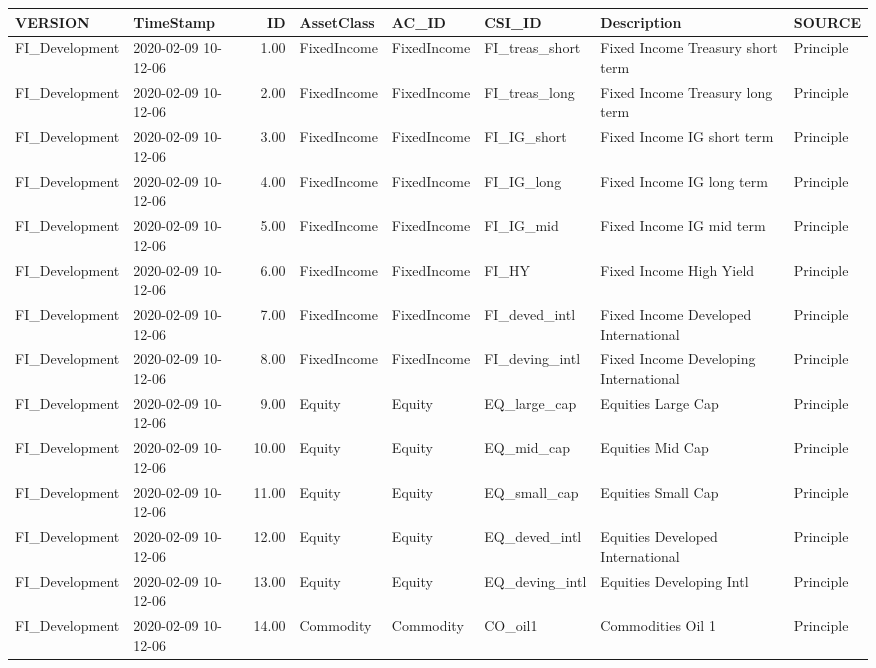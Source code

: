 \begin{longtable}{llrlllll}
  \hline
VERSION & TimeStamp & ID & AssetClass & AC\_ID & CSI\_ID & Description & SOURCE \\ 
  \hline
FI\_Development & 2020-02-09 10-12-06 & 1.00 & FixedIncome & FixedIncome & FI\_treas\_short & Fixed Income Treasury short term & Principle \\ 
  FI\_Development & 2020-02-09 10-12-06 & 2.00 & FixedIncome & FixedIncome & FI\_treas\_long & Fixed Income Treasury long term & Principle \\ 
  FI\_Development & 2020-02-09 10-12-06 & 3.00 & FixedIncome & FixedIncome & FI\_IG\_short & Fixed Income IG short term & Principle \\ 
  FI\_Development & 2020-02-09 10-12-06 & 4.00 & FixedIncome & FixedIncome & FI\_IG\_long & Fixed Income IG long term & Principle \\ 
  FI\_Development & 2020-02-09 10-12-06 & 5.00 & FixedIncome & FixedIncome & FI\_IG\_mid & Fixed Income IG mid term & Principle \\ 
  FI\_Development & 2020-02-09 10-12-06 & 6.00 & FixedIncome & FixedIncome & FI\_HY & Fixed Income High Yield & Principle \\ 
  FI\_Development & 2020-02-09 10-12-06 & 7.00 & FixedIncome & FixedIncome & FI\_deved\_intl & Fixed Income Developed International & Principle \\ 
  FI\_Development & 2020-02-09 10-12-06 & 8.00 & FixedIncome & FixedIncome & FI\_deving\_intl & Fixed Income Developing International & Principle \\ 
  FI\_Development & 2020-02-09 10-12-06 & 9.00 & Equity & Equity & EQ\_large\_cap & Equities Large Cap & Principle \\ 
  FI\_Development & 2020-02-09 10-12-06 & 10.00 & Equity & Equity & EQ\_mid\_cap & Equities Mid Cap & Principle \\ 
  FI\_Development & 2020-02-09 10-12-06 & 11.00 & Equity & Equity & EQ\_small\_cap & Equities Small Cap & Principle \\ 
  FI\_Development & 2020-02-09 10-12-06 & 12.00 & Equity & Equity & EQ\_deved\_intl & Equities Developed International & Principle \\ 
  FI\_Development & 2020-02-09 10-12-06 & 13.00 & Equity & Equity & EQ\_deving\_intl & Equities Developing Intl & Principle \\ 
  FI\_Development & 2020-02-09 10-12-06 & 14.00 & Commodity & Commodity & CO\_oil1 & Commodities Oil 1 & Principle \\ 

\end{longtable}
